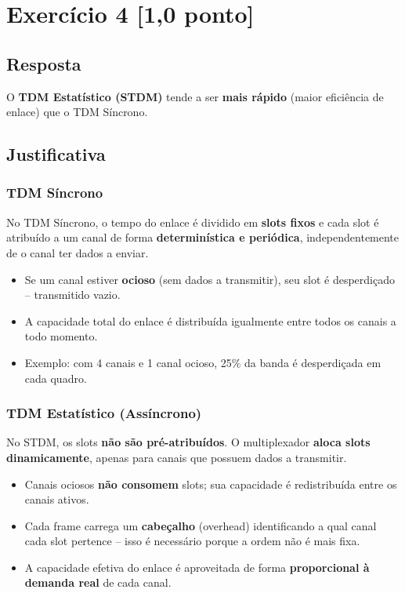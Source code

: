 \documentclass[12pt,a4paper]{article}
\begin{document}
\vspace{1em}

\section*{Exercício 4 \hfill \normalfont\small[1,0 ponto]}

\subsection*{Resposta}

O \textbf{TDM Estatístico (STDM)} tende a ser \textbf{mais rápido} (maior eficiência de enlace) que o TDM Síncrono.

\subsection*{Justificativa}

\subsubsection*{TDM Síncrono}

No TDM Síncrono, o tempo do enlace é dividido em \textbf{slots fixos} e cada slot é atribuído a um canal de forma \textbf{determinística e periódica}, independentemente de o canal ter dados a enviar.

\begin{itemize}
    \item Se um canal estiver \textbf{ocioso} (sem dados a transmitir), seu slot é desperdiçado -- transmitido vazio.
    \item A capacidade total do enlace é distribuída igualmente entre todos os canais a todo momento.
    \item Exemplo: com 4 canais e 1 canal ocioso, 25\% da banda é desperdiçada em cada quadro.
\end{itemize}

\subsubsection*{TDM Estatístico (Assíncrono)}

No STDM, os slots \textbf{não são pré-atribuídos}. O multiplexador \textbf{aloca slots dinamicamente}, apenas para canais que possuem dados a transmitir.

\begin{itemize}
    \item Canais ociosos \textbf{não consomem} slots; sua capacidade é redistribuída entre os canais ativos.
    \item Cada frame carrega um \textbf{cabeçalho} (overhead) identificando a qual canal cada slot pertence -- isso é necessário porque a ordem não é mais fixa.
    \item A capacidade efetiva do enlace é aproveitada de forma \textbf{proporcional à demanda real} de cada canal.
\end{itemize}
\end{document}
